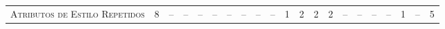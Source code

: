 \begin{table*}
\begin{tabular}{@{}p{3.5cm}p{0.3cm}p{.2cm}p{.2cm}p{.2cm}p{.2cm}p{.2cm}p{.2cm}p{.2cm}p{.2cm}p{.2cm}p{.4cm}p{.4cm}p{.4cm}p{.4cm}p{.4cm}p{.4cm}p{.4cm}p{.4cm}p{.4cm}p{0.2cm}@{}}
\textsc{Atributos de Estilo Repetidos}     	& \multicolumn{1}{c}{8} 	& \multicolumn{1}{c}{--} 	& \multicolumn{1}{c}{--} 	& \multicolumn{1}{c}{--} 	& \multicolumn{1}{c}{--} 	& \multicolumn{1}{c}{--} 	& \multicolumn{1}{c}{--} 	& \multicolumn{1}{c}{--} 	& \multicolumn{1}{c}{--} 	& \multicolumn{1}{c}{1} 	& \multicolumn{1}{c}{2} 	& \multicolumn{1}{c}{2} 	& \multicolumn{1}{c}{2} 	& \multicolumn{1}{c}{--} 	& \multicolumn{1}{c}{--} 	& \multicolumn{1}{c}{--}	& \multicolumn{1}{c}{--} 	& \multicolumn{1}{c}{1} 	& \multicolumn{1}{c}{--} 	& \multicolumn{1}{c}{5} \\


\end{tabular}
\end{table*}
